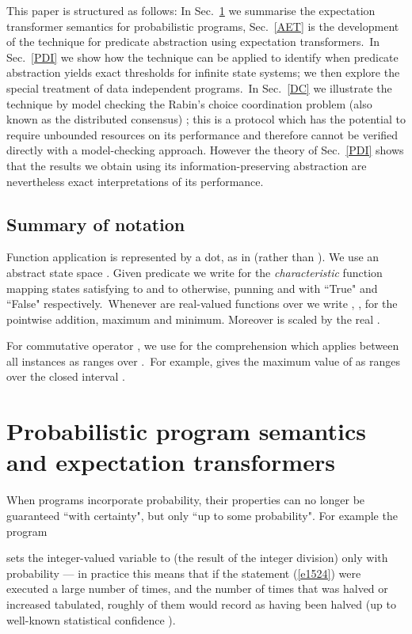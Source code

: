 \documentclass[numbers,copyright,creativecommons]{eptcs}
\newcommand{\Eqn}[1]{(\ref{#1})}
\newcommand{\Sec}[1]{Sec.~\ref{#1}}
\begin{document}
 This paper is structured as follows: In \Sec{ppt} we summarise the expectation transformer semantics for probabilistic programs, \Sec{AET} is the development of the technique for predicate abstraction using expectation transformers.\ In \Sec{PDI} we show how the technique can be applied to identify when  predicate abstraction yields exact thresholds for infinite state systems; we then explore the special treatment of data independent programs.\ In \Sec{DC} we illustrate the technique by model checking the Rabin's choice coordination problem (also known as the distributed consensus) \cite{Rabin82}; this is a protocol which  has the potential to require unbounded resources on its performance and therefore cannot be verified directly with a model-checking approach. However the theory of \Sec{PDI} shows that the results we obtain using its information-preserving abstraction are nevertheless exact interpretations of its performance.

\subsection{Summary of notation}
Function application
is represented by a dot, as in  (rather than ).
We use an abstract state space .
Given predicate  we write
 for the \emph{characteristic} function mapping states satisfying  to
 and to  otherwise, punning   and  with ``True" and ``False" respectively.\ Whenever  are real-valued functions  over  we write , ,  for the pointwise addition, maximum and minimum. Moreover  is  scaled by the real .

For commutative operator , we use   for the comprehension which applies  between all instances  as  ranges over .\ For example,  gives the maximum value of  as  ranges over the closed interval .



\section{Probabilistic program semantics and expectation transformers}\label{ppt}

When programs incorporate probability,  their properties can no longer be guaranteed
``with certainty", but only
 ``up to some probability".
For example the program


sets the integer-valued variable  to  (the result of the integer division) only with probability  --- in practice
this means that
if the statement \Eqn{e1524} were executed a large number of times, and the number of times that  was halved or increased  tabulated,
roughly  of them would record  as having been halved
 (up to well-known statistical confidence \cite{GW86}).
\end{document}
